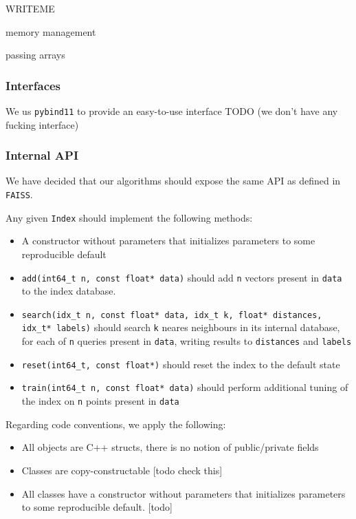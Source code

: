         WRITEME

        memory management
        
        passing arrays
    
    \subsubsection{Interfaces}
    
        We us \texttt{pybind11} to provide an easy-to-use interface
        TODO (we don't have any fucking interface)
        
    \subsubsection{Internal API}

        We have decided that our algorithms should expose the same API as defined in \texttt{FAISS}. 
        
        Any given \texttt{Index} should implement the following methods:
        \begin{itemize}
            
            \item A constructor without parameters that initializes parameters to some reproducible default
            
            \item \texttt{add(int64\_t n, const float* data)} 
                should add \texttt{n} vectors present in \texttt{data} to the index database.
            
            \item \texttt{search(idx\_t n, const float* data, idx\_t k, float* distances, idx\_t* labels)} 
                should search \texttt{k} neares neighbours 
                in its internal database, for each of \texttt{n} queries present in \texttt{data}, writing results to \texttt{distances} and \texttt{labels}
            
            \item \texttt{reset(int64\_t, const float*)} 
                should reset the index to the default state
            
            \item \texttt{train(int64\_t n, const float* data)} 
                should perform additional tuning of the index on \texttt{n} points present in \texttt{data}

        \end{itemize}
        
        Regarding code conventions, we apply the following:
        
        \begin{itemize}
            \item All objects are C++ structs, there is no notion of public/private fields
            \item Classes are copy-constructable [todo check this]
            \item All classes have a constructor without parameters that initializes parameters to some reproducible default. [todo]
        \end{itemize}
